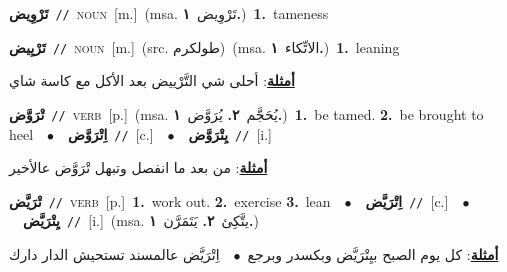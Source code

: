\documentclass[10pt,a4paper,twoside]{article} %
\begin{document}
\begin{multicols}{2}
{\setlength\topsep{0pt}\textbf{\foreignlanguage{arabic}{تَرْوِيض}}\ {\color{gray}\texttt{//}\color{black}}\ \textsc{noun}\ [m.]\ \color{gray}(msa. \foreignlanguage{arabic}{تَرْوِيض}~\foreignlanguage{arabic}{\textbf{١.}})\color{black}\ \textbf{1.}~tameness\ } \vspace{2mm}

{\setlength\topsep{0pt}\textbf{\foreignlanguage{arabic}{تَرْيِيض}}\ {\color{gray}\texttt{//}\color{black}}\ \textsc{noun}\ [m.]\ (src. \color{gray}\foreignlanguage{arabic}{طولكرم}\color{black})\ \color{gray}(msa. \foreignlanguage{arabic}{الاتِّكاء}~\foreignlanguage{arabic}{\textbf{١.}})\color{black}\ \textbf{1.}~leaning\  \begin{flushright}\color{gray}\foreignlanguage{arabic}{\textbf{\underline{\foreignlanguage{arabic}{أمثلة}}}: أحلى شي التَّرْييض بعد الأكل مع كاسة شاي}\end{flushright}\color{black}} \vspace{2mm}

{\setlength\topsep{0pt}\textbf{\foreignlanguage{arabic}{تْرَوَّض}}\ {\color{gray}\texttt{//}\color{black}}\ \textsc{verb}\ [p.]\ \color{gray}(msa. \foreignlanguage{arabic}{يُحَجَّم}~\foreignlanguage{arabic}{\textbf{٢.}}  \foreignlanguage{arabic}{يُرَوَّض}~\foreignlanguage{arabic}{\textbf{١.}})\color{black}\ \textbf{1.}~be tamed.  \textbf{2.}~be brought to heel\ \ $\bullet$\ \ \setlength\topsep{0pt}\textbf{\foreignlanguage{arabic}{اِتْرَوَّض}}\ {\color{gray}\texttt{//}\color{black}}\ [c.]\ \ $\bullet$\ \ \setlength\topsep{0pt}\textbf{\foreignlanguage{arabic}{يِتْرَوَّض}}\ {\color{gray}\texttt{//}\color{black}}\ [i.]\  \begin{flushright}\color{gray}\foreignlanguage{arabic}{\textbf{\underline{\foreignlanguage{arabic}{أمثلة}}}: من بعد ما انفصل وتبهل تْرَوَّض عالأخير}\end{flushright}\color{black}} \vspace{2mm}

{\setlength\topsep{0pt}\textbf{\foreignlanguage{arabic}{تْرَيَّض}}\ {\color{gray}\texttt{//}\color{black}}\ \textsc{verb}\ [p.]\ \textbf{1.}~work out.  \textbf{2.}~exercise  \textbf{3.}~lean\ \ $\bullet$\ \ \setlength\topsep{0pt}\textbf{\foreignlanguage{arabic}{اِتْرَيَّض}}\ {\color{gray}\texttt{//}\color{black}}\ [c.]\ \ $\bullet$\ \ \setlength\topsep{0pt}\textbf{\foreignlanguage{arabic}{يِتْرَيَّض}}\ {\color{gray}\texttt{//}\color{black}}\ [i.]\ \color{gray}(msa. \foreignlanguage{arabic}{يتَّكِئ}~\foreignlanguage{arabic}{\textbf{٢.}}  \foreignlanguage{arabic}{يَتَمَرَّن}~\foreignlanguage{arabic}{\textbf{١.}})\color{black}\  \begin{flushright}\color{gray}\foreignlanguage{arabic}{\textbf{\underline{\foreignlanguage{arabic}{أمثلة}}}: كل يوم الصبح بيِتْرَيَّض وبكسدر وبرجع\ $\bullet$\ \  اِتْرَيَّض عالمسند تستحيش الدار دارك}\end{flushright}\color{black}} \vspace{2mm}


\end{multicols}
\end{document}
